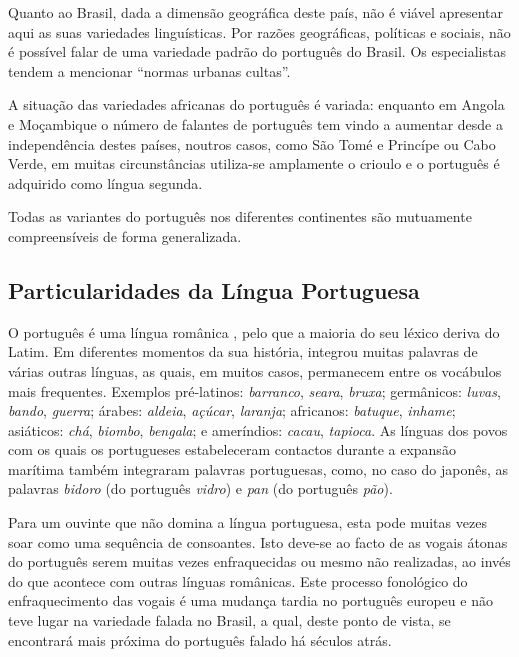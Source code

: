 \begin{multicols}{2}
Quanto ao Brasil, dada a dimensão geográfica deste país, não é viável apresentar aqui as suas variedades linguísticas. Por razões geográficas, políticas e sociais, não é possível falar de uma variedade padrão do português do Brasil. Os especialistas tendem a mencionar “normas urbanas cultas”. 

A situação das variedades africanas do português é variada: enquanto em Angola e Moçambique o número de falantes de português tem vindo a aumentar desde a independência destes países, noutros casos, como São Tomé e Princípe ou Cabo Verde, em muitas circunstâncias utiliza-se amplamente o crioulo e o português é adquirido como língua segunda.

Todas as variantes do português nos diferentes continentes são mutuamente compreensíveis de forma generalizada.


\subsection{Particularidades da Língua Portuguesa}

O português é uma língua românica \cite{cardeira}, pelo que a maioria do seu léxico deriva do Latim. 
Em diferentes momentos da sua história, integrou muitas palavras de várias outras línguas,  as quais, em muitos casos, permanecem entre os vocábulos mais frequentes. Exemplos pré-latinos: \textit{barranco}, \textit{seara}, \textit{bruxa}; germânicos: \textit{luvas}, \textit{bando}, \textit{guerra}; árabes: \textit{aldeia}, \textit{açúcar}, \textit{laranja}; africanos: \textit{batuque}, \textit{i\-nha\-me}; asiáticos: \textit{chá}, \textit{biombo}, \textit{bengala}; e ameríndios: \textit{cacau}, \textit{tapioca}. As línguas dos povos com os quais os portugueses estabeleceram contactos durante a expansão marítima também integraram palavras portuguesas, como, no caso do japonês, as palavras \textit{bidoro} (do português \textit{vidro}) e \textit{pan} (do português \textit{pão}).

Para um ouvinte que não domina a língua portuguesa, esta pode muitas vezes soar como uma sequência de consoantes. 
Isto deve-se ao facto de as vogais átonas do português serem muitas vezes enfraquecidas ou mesmo não realizadas, ao invés
do que acontece com outras línguas românicas. 
Este processo fonológico do enfraquecimento das vogais é uma mudança tardia no português europeu 
e não teve lugar na variedade falada no Brasil, a qual, deste ponto de vista, se encontrará mais próxima
do português falado há séculos atrás.


\end{multicols}
